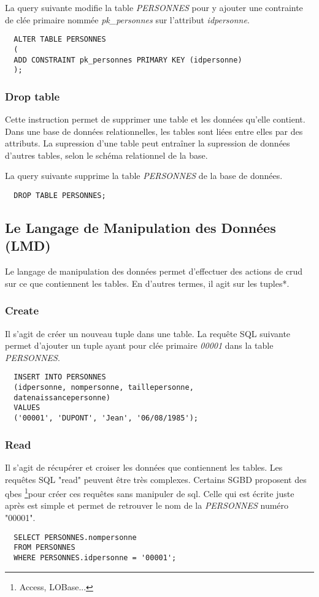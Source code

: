 La \gls{query} suivante modifie la table \textit{PERSONNES} pour y ajouter une contrainte de clée primaire nommée \textit{pk\_personnes} sur l'attribut \textit{idpersonne}.

\begin{lstlisting}
  ALTER TABLE PERSONNES
  (
  ADD CONSTRAINT pk_personnes PRIMARY KEY (idpersonne)
  );
\end{lstlisting}

\subsubsection{Drop table}
Cette instruction permet de supprimer une table et les données qu'elle contient.
Dans une base de données relationnelles, les tables sont liées entre elles par des attributs.
La supression d'une table peut entraîner la supression de données d'autres tables, selon le schéma relationnel de la base.

La \gls{query} suivante supprime la table \textit{PERSONNES} de la base de données.
\begin{lstlisting}
  DROP TABLE PERSONNES;
\end{lstlisting}

\subsection{Le Langage de Manipulation des Données (LMD)}
Le langage de manipulation des données permet d'effectuer des actions de \gls{crud} sur ce que contiennent les tables.
En d'autres termes, il agit sur les \glspl{tuple}*.

\subsubsection{Create}
Il s'agit de créer un nouveau tuple dans une table.
La requête SQL suivante permet d'ajouter un tuple ayant pour clée primaire \textit{00001} dans la table \textit{PERSONNES}.
\begin{lstlisting}
  INSERT INTO PERSONNES
  (idpersonne, nompersonne, taillepersonne,
  datenaissancepersonne)
  VALUES
  ('00001', 'DUPONT', 'Jean', '06/08/1985');
\end{lstlisting}

\subsubsection{Read}
Il s'agit de récupérer et croiser les données que contiennent les tables.
Les requêtes SQL "read" peuvent être très complexes.
Certains SGBD proposent des \glspl{qbe}
\footnote{Access, LOBase...}pour créer ces requêtes sans manipuler de \gls{sql}.
Celle qui est écrite juste après est simple et permet de retrouver le nom de la \textit{PERSONNES} numéro "00001".
\begin{lstlisting}
  SELECT PERSONNES.nompersonne
  FROM PERSONNES
  WHERE PERSONNES.idpersonne = '00001';
\end{lstlisting}

